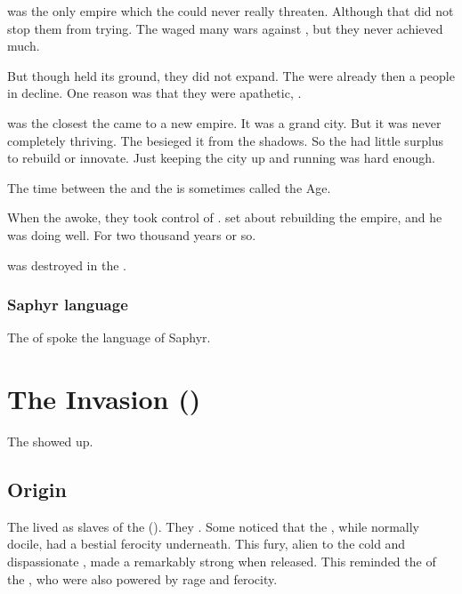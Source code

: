 \Saphyrae{} was the only \quiljaaran{} empire which the \aryothim{} could never really threaten. 
Although that did not stop them from trying. 
The \aryothim{} waged many wars against \Saphyrae, but they never achieved much. 

But though \Saphyrae{} held its ground, they did not expand. 
The \quiljaaran{} were already then a people in decline. 
One reason was that they were apathetic, . 

\Saphyrae was the closest the \ophidians came to a new empire. 
It was a grand city.
But it was never completely thriving. 
The \noggyaleth besieged it from the shadows. 
So the \ophidians had little surplus to rebuild or innovate. 
Just keeping the city up and running was hard enough. 

The time between the \firstbanewar{} and the  is sometimes called the \Saphyraean{} Age. 

When the \dragons awoke, they took control of \Saphyrae. 
\Nexagglachel set about rebuilding the \ophidian empire, and he was doing well. 
For two thousand years or so. 

\Saphyrae was destroyed in the \secondbanewar. 





\subsubsection{Saphyr language}
The \caisith of \Saphyrae spoke the language of Saphyr.















\section{The \Aryoth Invasion ()}
The \aryothim{} showed up. 





\subsection{Origin}
The \nephilim lived as slaves of the \ophidians (). 
They .
Some \ophidians noticed that the \nephilim, while normally docile, had a bestial ferocity underneath.
This fury, alien to the cold and dispassionate \ophidians, made a \nephil remarkably strong when released. 
This reminded the \ophidians of the \dragons, who were also powered by rage and ferocity.

